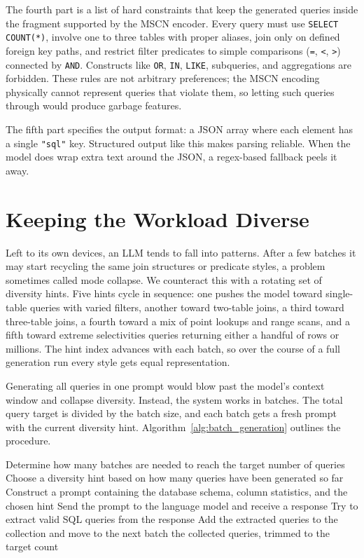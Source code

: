The fourth part is a list of hard constraints that keep the generated queries inside the fragment supported by the MSCN encoder. Every query must use \texttt{SELECT COUNT(*)}, involve one to three tables with proper aliases, join only on defined foreign key paths, and restrict filter predicates to simple comparisons (\texttt{=}, \texttt{<}, \texttt{>}) connected by \texttt{AND}. Constructs like \texttt{OR}, \texttt{IN}, \texttt{LIKE}, subqueries, and aggregations are forbidden. These rules are not arbitrary preferences; the MSCN encoding physically cannot represent queries that violate them, so letting such queries through would produce garbage features.

The fifth part specifies the output format: a JSON array where each element has a single \texttt{"sql"} key. Structured output like this makes parsing reliable. When the model does wrap extra text around the JSON, a regex-based fallback peels it away.


\section{Keeping the Workload Diverse}

Left to its own devices, an LLM tends to fall into patterns. After a few batches it may start recycling the same join structures or predicate styles, a problem sometimes called mode collapse. We counteract this with a rotating set of diversity hints. Five hints cycle in sequence: one pushes the model toward single-table queries with varied filters, another toward two-table joins, a third toward three-table joins, a fourth toward a mix of point lookups and range scans, and a fifth toward extreme selectivities queries returning either a handful of rows or millions. The hint index advances with each batch, so over the course of a full generation run every style gets equal representation.

Generating all queries in one prompt would blow past the model's context window and collapse diversity. Instead, the system works in batches. The total query target is divided by the batch size, and each batch gets a fresh prompt with the current diversity hint. Algorithm~\ref{alg:batch_generation} outlines the procedure.

\begin{algorithm}[htbp]
\caption{LLM-Based Query Generation}
\label{alg:batch_generation}
\begin{algorithmic}[1]
\State Determine how many batches are needed to reach the target number of queries
    \State Choose a diversity hint based on how many queries have been generated so far
    \State Construct a prompt containing the database schema, column statistics, and the chosen hint
        \State Send the prompt to the language model and receive a response
        \State Try to extract valid SQL queries from the response
            \State Add the extracted queries to the collection and move to the next batch
        \EndIf
    \EndFor
\EndFor
\State \Return the collected queries, trimmed to the target count
\end{algorithmic}
\end{algorithm}

